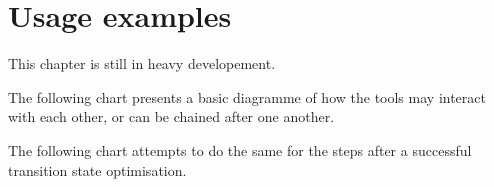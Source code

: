 \documentclass[   %
  final,          %
  a4paper         %
]{article}
\begin{document}
\section{Usage examples}

This chapter is still in heavy developement.

The following chart presents a basic diagramme of how the tools may interact with each other,
or can be chained after one another.


The following chart attempts to do the same for the steps after a successful 
transition state optimisation.

\end{document}
